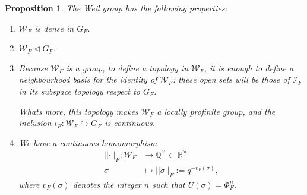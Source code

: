 \documentclass[12pt]{article}
\theoremstyle{plain}
\newtheorem{proposition}[theorem]{Proposition}
\theoremstyle{definition}
\newcommand{\rationals}{\mathbb{Q}}
\newcommand{\reals}{\mathbb{R}}
\newcommand{\Abs}[1]{\left \vert \left \vert #1 \right \vert \right \vert}
\newcommand{\inercia}[1]{\mathcal I_{#1}}
\newcommand{\weil}[1]{\mathcal W_{#1}}
\begin{document}
\begin{proposition}
The Weil group has the following properties:
\begin{enumerate}
\item $\weil F$ is dense in $G_F$.
\item $\weil F \triangleleft G_F$.
\item Because $\weil F$ is a group, to define a topology in $\weil F$, it is enough to define a neighbourhood basis for the identity of $\weil F$: these open sets will be those of $\inercia F$ in its subspace topology respect to $G_F$.

Whats more, this topology makes $\weil F$ a \textit{locally profinite} group, and the inclusion $\iota_F : \weil F \hookrightarrow G_F$ is continuous.
\item We have a continuous homomorphism
\begin{align*}
\Abs \cdot _F : \weil F &\longrightarrow \rationals^{\times} \subset \reals^{\times} \\
\sigma &\longmapsto \Abs \sigma _F := q^{- v_F (\sigma)},
\end{align*}
where $v_F (\sigma)$ denotes the integer $n$ such that $U(\sigma) = \Phi_F^n$.
\end{enumerate}
\end{proposition}
\end{document}
